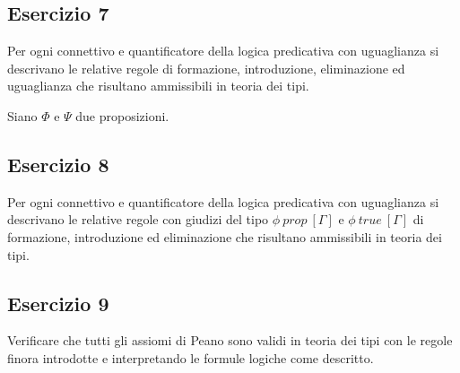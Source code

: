 \subsection{Esercizio 7}
\begin{thm}
	Per ogni connettivo e quantificatore della logica predicativa con uguaglianza si descrivano le relative regole di formazione, introduzione, eliminazione ed uguaglianza che risultano ammissibili in teoria dei tipi.
\end{thm}
Siano $\Phi$ e $\Psi$ due proposizioni.


\subsection{Esercizio 8}
\begin{thm}
	Per ogni connettivo e quantificatore della logica predicativa con uguaglianza si descrivano le relative regole con giudizi del tipo $\phi~prop~[\Gamma]$ e $\phi~true~[\Gamma]$ di formazione, introduzione ed eliminazione che risultano ammissibili in teoria dei tipi.
\end{thm}


\subsection{Esercizio 9}
\begin{thm}
	Verificare che tutti gli assiomi di Peano sono validi in teoria dei tipi con le regole finora introdotte e interpretando le formule logiche come descritto.
\end{thm}

